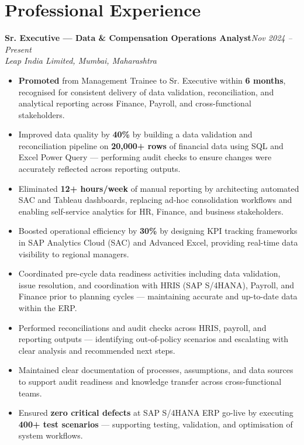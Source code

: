 \documentclass[10pt, letterpaper]{article}
\newcommand{\role}[3]{%
  \vspace{2pt}%
  {\bfseries #1}\hfill{\small\color{muted}\textit{#3}}\\[-2pt]%
  {\small\color{muted}\textit{#2}}%
}
\begin{document}
\section{Professional Experience}

\role{Sr. Executive — Data \& Compensation Operations Analyst}{Leap India Limited, Mumbai, Maharashtra}{Nov 2024 – Present}

\begin{itemize}
  \item \textbf{Promoted} from Management Trainee to Sr. Executive within \textbf{6 months}, recognised for consistent delivery of data validation, reconciliation, and analytical reporting across Finance, Payroll, and cross-functional stakeholders.
  \item Improved data quality by \textbf{40\%} by building a data validation and reconciliation pipeline on \textbf{20,000+ rows} of financial data using SQL and Excel Power Query — performing audit checks to ensure changes were accurately reflected across reporting outputs.
  \item Eliminated \textbf{12+ hours/week} of manual reporting by architecting automated SAC and Tableau dashboards, replacing ad-hoc consolidation workflows and enabling self-service analytics for HR, Finance, and business stakeholders.
  \item Boosted operational efficiency by \textbf{30\%} by designing KPI tracking frameworks in SAP Analytics Cloud (SAC) and Advanced Excel, providing real-time data visibility to regional managers.
  \item Coordinated pre-cycle data readiness activities including data validation, issue resolution, and coordination with HRIS (SAP S/4HANA), Payroll, and Finance prior to planning cycles — maintaining accurate and up-to-date data within the ERP.
  \item Performed reconciliations and audit checks across HRIS, payroll, and reporting outputs — identifying out-of-policy scenarios and escalating with clear analysis and recommended next steps.
  \item Maintained clear documentation of processes, assumptions, and data sources to support audit readiness and knowledge transfer across cross-functional teams.
  \item Ensured \textbf{zero critical defects} at SAP S/4HANA ERP go-live by executing \textbf{400+ test scenarios} — supporting testing, validation, and optimisation of system workflows.
\end{itemize}
\end{document}

